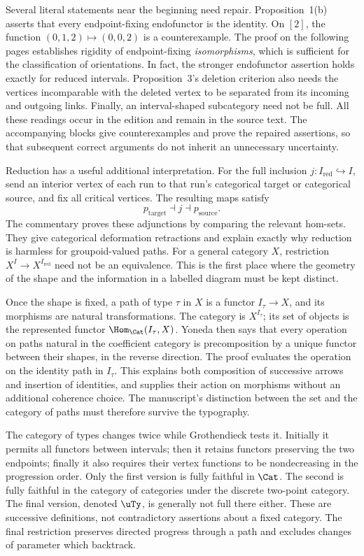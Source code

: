 Several literal statements near the beginning need repair. Proposition~1(b) asserts that every endpoint-fixing endofunctor is the identity. On $[2]$, the function $(0,1,2)\mapsto(0,0,2)$ is a counterexample. The proof on the following pages establishes rigidity of endpoint-fixing \emph{isomorphisms}, which is sufficient for the classification of orientations. In fact, the stronger endofunctor assertion holds exactly for reduced intervals. Proposition~3's deletion criterion also needs the vertices incomparable with the deleted vertex to be separated from its incoming and outgoing links. Finally, an interval-shaped subcategory need not be full. All these readings occur in the edition and remain in the source text. The accompanying blocks give counterexamples and prove the repaired assertions, so that subsequent correct arguments do not inherit an unnecessary uncertainty.

Reduction has a useful additional interpretation. For the full inclusion $j:I_{\mathrm{red}}\hookrightarrow I$, send an interior vertex of each run to that run's categorical target or categorical source, and fix all critical vertices. The resulting maps satisfy
\[
 p_{\mathrm{target}}\dashv j\dashv p_{\mathrm{source}}.
\]
The commentary proves these adjunctions by comparing the relevant hom-sets. They give categorical deformation retractions and explain exactly why reduction is harmless for groupoid-valued paths. For a general category $X$, restriction $X^I\to X^{I_{\mathrm{red}}}$ need not be an equivalence. This is the first place where the geometry of the shape and the information in a labelled diagram must be kept distinct.

Once the shape is fixed, a path of type $\tau$ in $X$ is a functor $I_\tau\to X$, and its morphisms are natural transformations. The category is $X^{I_\tau}$; its set of objects is the represented functor $\Hom_{\Cat}(I_\tau,X)$. Yoneda then says that every operation on paths natural in the coefficient category is precomposition by a unique functor between their shapes, in the reverse direction. The proof evaluates the operation on the identity path in $I_\tau$. This explains both composition of successive arrows and insertion of identities, and supplies their action on morphisms without an additional coherence choice. The manuscript's distinction between the set and the category of paths must therefore survive the typography.

The category of types changes twice while Grothendieck tests it. Initially it permits all functors between intervals; then it retains functors preserving the two endpoints; finally it also requires their vertex functions to be nondecreasing in the progression order. Only the first version is fully faithful in $\Cat$. The second is fully faithful in the category of categories under the discrete two-point category. The final version, denoted $\uTy$, is generally not full there either. These are successive definitions, not contradictory assertions about a fixed category. The final restriction preserves directed progress through a path and excludes changes of parameter which backtrack.


